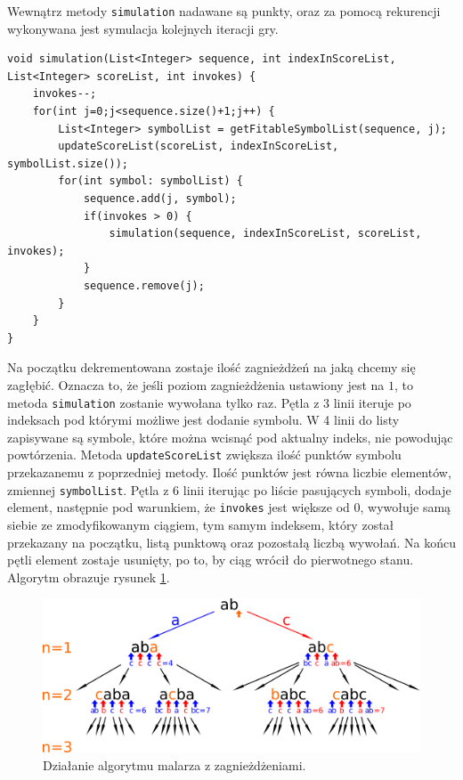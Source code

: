 \documentclass[document]{xmgr}
\begin{document}
Wewnątrz metody \texttt{simulation} nadawane są punkty, oraz za pomocą rekurencji wykonywana jest symulacja kolejnych iteracji gry.

\begin{lstlisting}[frame=single]
void simulation(List<Integer> sequence, int indexInScoreList, List<Integer> scoreList, int invokes) {
	invokes--;
	for(int j=0;j<sequence.size()+1;j++) {
		List<Integer> symbolList = getFitableSymbolList(sequence, j);
		updateScoreList(scoreList, indexInScoreList, symbolList.size());
		for(int symbol: symbolList) {
			sequence.add(j, symbol);
			if(invokes > 0) {
				simulation(sequence, indexInScoreList, scoreList, invokes);
			}
			sequence.remove(j);
		}
	}
}
\end{lstlisting}

Na początku dekrementowana zostaje ilość zagnieżdżeń na jaką chcemy się zagłębić. Oznacza to, że jeśli poziom zagnieżdżenia ustawiony jest na $1$, to metoda \texttt{simulation} zostanie wywołana tylko raz. Pętla z 3 linii iteruje po indeksach pod którymi możliwe jest dodanie symbolu. W 4 linii do listy zapisywane są symbole, które można wcisnąć pod aktualny indeks, nie powodując powtórzenia. Metoda \texttt{updateScoreList} zwiększa ilość punktów symbolu przekazanemu z poprzedniej metody. Ilość punktów jest równa liczbie elementów, zmiennej \texttt{symbolList}. Pętla z 6 linii iterując po liście pasujących symboli, dodaje element, następnie pod warunkiem, że \mbox{\texttt{invokes}} jest większe od $0$, wywołuje samą siebie ze zmodyfikowanym ciągiem, tym samym indeksem, który został przekazany na początku, listą punktową oraz pozostałą liczbą wywołań. Na końcu pętli element zostaje usunięty, po to, by ciąg wrócił do pierwotnego stanu. Algorytm obrazuje rysunek \ref{fig:nestingPainter}.

\begin{figure}[tbh]
    \centering
    \includegraphics[width = \textwidth]{images/nestingPainter}
    \caption{Działanie algorytmu malarza z zagnieżdżeniami.}
    \label{fig:nestingPainter}
\end{figure}
\end{document}
